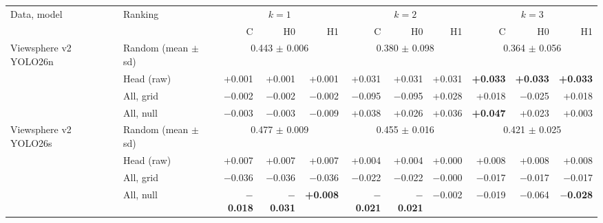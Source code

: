 \begin{tabular}{llrrrrrrrrr}
\toprule
Data, model & Ranking & \multicolumn{3}{c}{$k=1$} & \multicolumn{3}{c}{$k=2$} & \multicolumn{3}{c}{$k=3$} \\
\cmidrule(lr){3-5}\cmidrule(lr){6-8}\cmidrule(lr){9-11}
 & & C & H0 & H1 & C & H0 & H1 & C & H0 & H1 \\
\midrule
Viewsphere v2 YOLO26n & Random (mean $\pm$ sd) & \multicolumn{3}{c}{0.443 $\pm$ 0.006} & \multicolumn{3}{c}{0.380 $\pm$ 0.098} & \multicolumn{3}{c}{0.364 $\pm$ 0.056} \\
 & Head (raw) & +0.001 & +0.001 & +0.001 & +0.031 & +0.031 & +0.031 & \textbf{+0.033} & \textbf{+0.033} & \textbf{+0.033} \\
 & All, grid & $-$0.002 & $-$0.002 & $-$0.002 & $-$0.095 & $-$0.095 & +0.028 & +0.018 & $-$0.025 & +0.018 \\
 & All, null & $-$0.003 & $-$0.003 & $-$0.009 & +0.038 & +0.026 & +0.036 & \textbf{+0.047} & +0.023 & +0.003 \\
\midrule
Viewsphere v2 YOLO26s & Random (mean $\pm$ sd) & \multicolumn{3}{c}{0.477 $\pm$ 0.009} & \multicolumn{3}{c}{0.455 $\pm$ 0.016} & \multicolumn{3}{c}{0.421 $\pm$ 0.025} \\
 & Head (raw) & +0.007 & +0.007 & +0.007 & +0.004 & +0.004 & +0.000 & +0.008 & +0.008 & +0.008 \\
 & All, grid & $-$0.036 & $-$0.036 & $-$0.036 & $-$0.022 & $-$0.022 & $-$0.000 & $-$0.017 & $-$0.017 & $-$0.017 \\
 & All, null & \textbf{$-$0.018} & \textbf{$-$0.031} & \textbf{+0.008} & \textbf{$-$0.021} & \textbf{$-$0.021} & $-$0.002 & $-$0.019 & $-$0.064 & \textbf{$-$0.028} \\
\bottomrule
\end{tabular}
